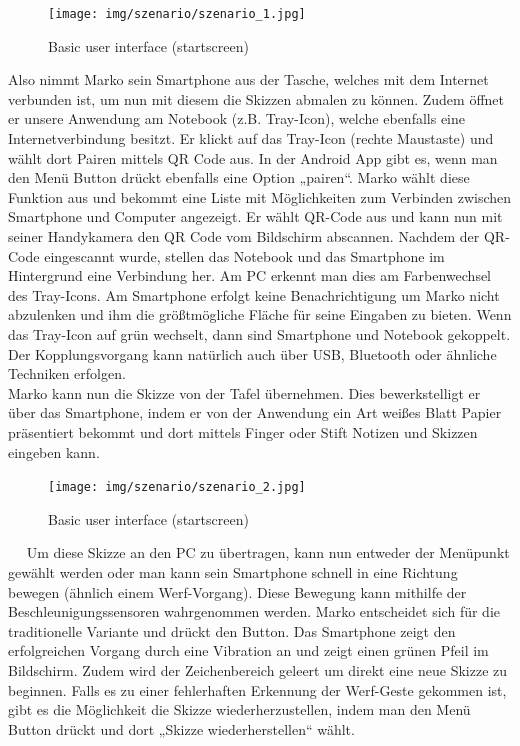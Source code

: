 \documentclass{chi-ext}
\begin{document}
\begin{figure}
  \centering
  \texttt{[image: img/szenario/szenario\_1.jpg]}
  \caption{Basic user interface (startscreen)}
  \label{fig:mockup_startscreen}
\end{figure}

Also nimmt Marko sein Smartphone aus der Tasche, welches mit dem Internet verbunden ist, um nun mit diesem die Skizzen abmalen zu können. Zudem öffnet er unsere Anwendung am Notebook (z.B. Tray-Icon), welche ebenfalls eine Internetverbindung besitzt. Er klickt auf das Tray-Icon (rechte Maustaste) und wählt dort Pairen mittels QR Code aus. In der Android App gibt es, wenn man den Menü Button drückt ebenfalls eine Option „pairen“. Marko wählt diese Funktion aus und bekommt eine Liste mit Möglichkeiten zum Verbinden zwischen Smartphone und Computer angezeigt. Er wählt QR-Code aus und kann nun mit seiner Handykamera den QR Code vom Bildschirm abscannen. Nachdem der QR-Code eingescannt wurde, stellen das Notebook und das Smartphone im Hintergrund eine Verbindung her. Am PC erkennt man dies am Farbenwechsel des Tray-Icons. Am Smartphone erfolgt keine Benachrichtigung um Marko nicht abzulenken und ihm die größtmögliche Fläche für seine Eingaben zu bieten. Wenn das Tray-Icon auf grün wechselt, dann sind Smartphone und Notebook gekoppelt. Der Kopplungsvorgang kann natürlich auch über USB, Bluetooth oder ähnliche Techniken erfolgen.\\
Marko kann nun die Skizze von der Tafel übernehmen. Dies bewerkstelligt er über das Smartphone, indem er von der Anwendung ein Art weißes Blatt Papier präsentiert bekommt und dort mittels Finger oder Stift Notizen und Skizzen eingeben kann.

\begin{figure}
  \centering
  \texttt{[image: img/szenario/szenario\_2.jpg]}
  \caption{Basic user interface (startscreen)}
  \label{fig:mockup_startscreen}
\end{figure}
 
Um diese Skizze an den PC zu übertragen, kann nun entweder der Menüpunkt gewählt werden oder man kann sein Smartphone schnell in eine Richtung bewegen (ähnlich einem Werf-Vorgang). Diese Bewegung kann mithilfe der Beschleunigungssensoren wahrgenommen werden. Marko entscheidet sich für die traditionelle Variante und drückt den Button.
Das Smartphone zeigt den erfolgreichen Vorgang durch eine Vibration an und zeigt einen grünen Pfeil im Bildschirm. Zudem wird der Zeichenbereich geleert um direkt eine neue Skizze zu beginnen. Falls es zu einer fehlerhaften Erkennung der Werf-Geste gekommen ist, gibt es die Möglichkeit die Skizze wiederherzustellen, indem man den Menü Button drückt und dort „Skizze wiederherstellen“ wählt.
\end{document}
